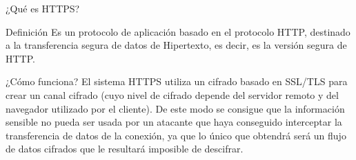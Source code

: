 \documentclass{beamer}
\begin{document}
\begin{frame}{¿Qué es HTTPS?}
\begin{block}{Definición}
	Es un protocolo de aplicación basado en el protocolo HTTP, destinado a la transferencia segura de datos de Hipertexto, es decir, es la versión segura de HTTP.
\end{block}
\begin{block}{¿Cómo funciona?}
	El sistema HTTPS utiliza un cifrado basado en SSL/TLS para crear un canal cifrado (cuyo nivel de cifrado depende del servidor remoto y del navegador utilizado por el cliente). De este modo se consigue que la información sensible no pueda ser usada por un atacante que haya conseguido interceptar la transferencia de datos de la conexión, ya que lo único que obtendrá será un flujo de datos cifrados que le resultará imposible de descifrar.
\end{block}
\end{frame}


\end{document}
